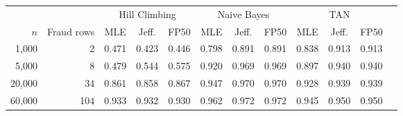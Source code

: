 \begin{tabular}{rrcccccccccc}\toprule
 & & \multicolumn{3}{c}{Hill Climbing} & \multicolumn{3}{c}{Naive Bayes} & \multicolumn{3}{c}{TAN}\\\cmidrule(lr){3-5}\cmidrule(lr){6-8}\cmidrule(lr){9-11}
$n$ & Fraud rows & MLE & Jeff. & FP50 & MLE & Jeff. & FP50 & MLE & Jeff. & FP50\\\midrule
1,000 & 2 & 0.471 & 0.423 & 0.446 & 0.798 & 0.891 & 0.891 & 0.838 & 0.913 & 0.913\\
5,000 & 8 & 0.479 & 0.544 & 0.575 & 0.920 & 0.969 & 0.969 & 0.897 & 0.940 & 0.940\\
20,000 & 34 & 0.861 & 0.858 & 0.867 & 0.947 & 0.970 & 0.970 & 0.928 & 0.939 & 0.939\\
60,000 & 104 & 0.933 & 0.932 & 0.930 & 0.962 & 0.972 & 0.972 & 0.945 & 0.950 & 0.950\\
\bottomrule\end{tabular}